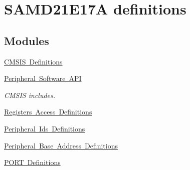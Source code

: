 \hypertarget{group___s_a_m_d21_e17_a__definitions}{}\section{S\+A\+M\+D21\+E17A definitions}
\label{group___s_a_m_d21_e17_a__definitions}
\subsection*{Modules}
\begin{DoxyCompactItemize}
\item 
\mbox{\hyperlink{group___s_a_m_d21_e17_a__cmsis}{C\+M\+S\+I\+S Definitions}}
\item 
\mbox{\hyperlink{group___s_a_m_d21_e17_a__api}{Peripheral Software A\+PI}}
\begin{DoxyCompactList}\small\item\em C\+M\+S\+IS includes. \end{DoxyCompactList}\item 
\mbox{\hyperlink{group___s_a_m_d21_e17_a__reg}{Registers Access Definitions}}
\item 
\mbox{\hyperlink{group___s_a_m_d21_e17_a__id}{Peripheral Ids Definitions}}
\item 
\mbox{\hyperlink{group___s_a_m_d21_e17_a__base}{Peripheral Base Address Definitions}}
\item 
\mbox{\hyperlink{group___s_a_m_d21_e17_a__port}{P\+O\+R\+T Definitions}}
\end{DoxyCompactItemize}

